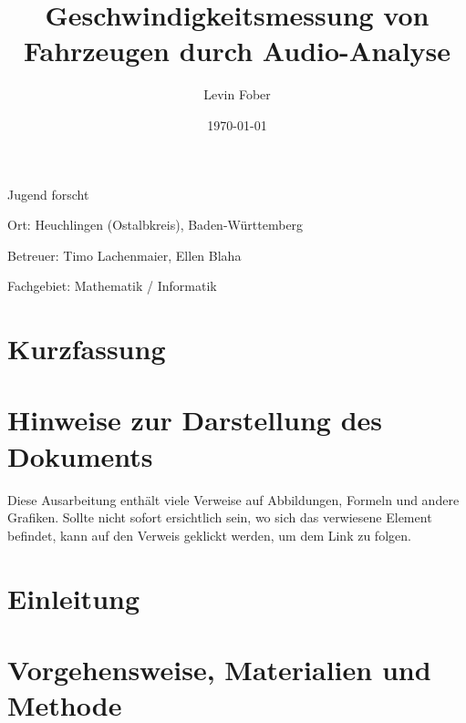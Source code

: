 \documentclass[11pt, a4paper]{article}
\title{\textbf{Geschwindigkeitsmessung von Fahrzeugen durch Audio-Analyse}}
\author{Levin Fober}
\date{\today}
\begin{document}

\maketitle

\begin{center}
    Jugend forscht

    Ort: Heuchlingen (Ostalbkreis), Baden-Württemberg

    Betreuer: Timo Lachenmaier, Ellen Blaha

    Fachgebiet: Mathematik / Informatik
\end{center}

\newpage

\thispagestyle{plain}

\section*{Kurzfassung}



\newpage

\thispagestyle{plain}

\tableofcontents

\newpage

\section*{Hinweise zur Darstellung des Dokuments}

Diese Ausarbeitung enthält viele Verweise auf Abbildungen, Formeln und andere Grafiken. Sollte nicht sofort ersichtlich sein, wo sich das verwiesene Element befindet, kann auf den Verweis geklickt werden, um dem Link zu folgen.

\thispagestyle{plain}

\cleardoublepage%

\section{Einleitung}


\section{Vorgehensweise, Materialien und Methode}

\end{document}
